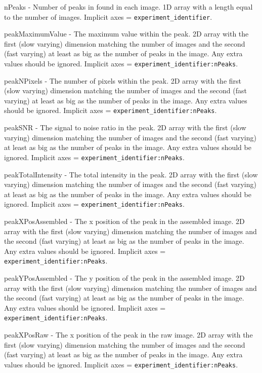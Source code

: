\documentclass[usletter,11pt]{article}
\newcommand{\member}[2]
{ \noindent
{ \color{softBlue}  #1 - } #2
\vspace{0.2cm}
}
\begin{document}
\member{nPeaks}{Number of peaks in found in each image. 1D array with a length
  equal to the number of images. Implicit axes = {\tt experiment\_identifier}.}

\member{peakMaximumValue}{The maximum value within the peak. 2D array with the
  first (slow varying) dimension matching the number of images and the second
  (fast varying) at least as big as the number of peaks in
  the image. Any extra values should be ignored. Implicit axes = {\tt experiment\_identifier:nPeaks}.}

\member{peakNPixels}{The number of pixels within the peak. 2D array with the
  first (slow varying) dimension matching the number of images and the second
  (fast varying) at least as big as the number of peaks in
  the image. Any extra values should be ignored. Implicit axes = {\tt experiment\_identifier:nPeaks}.}

\member{peakSNR}{The signal to noise ratio in the peak. 2D array with the
  first (slow varying) dimension matching the number of images and the second
  (fast varying) at least as big as the number of peaks in
  the image. Any extra values should be ignored. Implicit axes = {\tt experiment\_identifier:nPeaks}.}

\member{peakTotalIntensity}{The total intensity in the peak. 2D array with the
  first (slow varying) dimension matching the number of images and the second
  (fast varying) at least as big as the number of peaks in
  the image. Any extra values should be ignored. Implicit axes = {\tt experiment\_identifier:nPeaks}.}

\member{peakXPosAssembled}{The x position of the peak in the assembled image. 2D array with the
  first (slow varying) dimension matching the number of images and the second
  (fast varying) at least as big as the number of peaks in
  the image. Any extra values should be ignored. Implicit axes = {\tt experiment\_identifier:nPeaks}.}

\member{peakYPosAssembled}{The y position of the peak in the assembled image. 2D array with the
  first (slow varying) dimension matching the number of images and the second
  (fast varying) at least as big as the number of peaks in
  the image. Any extra values should be ignored. Implicit axes = {\tt experiment\_identifier:nPeaks}.}

\member{peakXPosRaw}{The x position of the peak in the raw image. 2D array with the
  first (slow varying) dimension matching the number of images and the second
  (fast varying) at least as big as the number of peaks in
  the image. Any extra values should be ignored. Implicit axes = {\tt experiment\_identifier:nPeaks}.}
\end{document}
